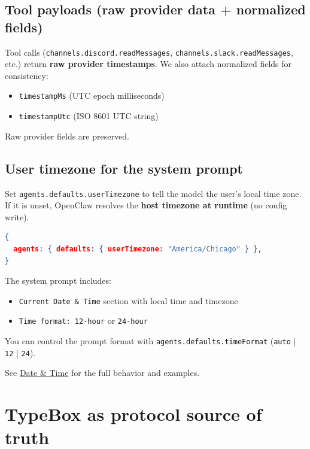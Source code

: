 \subsection{Tool payloads (raw provider data + normalized fields)}


Tool calls (\texttt{channels.discord.readMessages}, \texttt{channels.slack.readMessages}, etc.) return \textbf{raw provider timestamps}.
We also attach normalized fields for consistency:

\begin{itemize}
  \item \texttt{timestampMs} (UTC epoch milliseconds)
  \item \texttt{timestampUtc} (ISO 8601 UTC string)
\end{itemize}


Raw provider fields are preserved.

\subsection{User timezone for the system prompt}


Set \texttt{agents.defaults.userTimezone} to tell the model the user's local time zone. If it is
unset, OpenClaw resolves the \textbf{host timezone at runtime} (no config write).

\begin{lstlisting}[language=json]
{
  agents: { defaults: { userTimezone: "America/Chicago" } },
}
\end{lstlisting}


The system prompt includes:

\begin{itemize}
  \item \texttt{Current Date \& Time} section with local time and timezone
  \item \texttt{Time format: 12-hour} or \texttt{24-hour}
\end{itemize}


You can control the prompt format with \texttt{agents.defaults.timeFormat} (\texttt{auto} | \texttt{12} | \texttt{24}).

See \href{/date-time}{Date \& Time} for the full behavior and examples.


\clearpage

\section{TypeBox as protocol source of truth}


